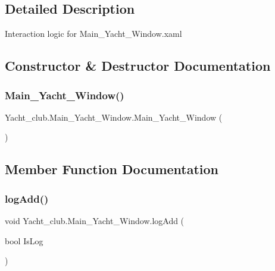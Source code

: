 \subsection{Detailed Description}
Interaction logic for Main\+\_\+\+Yacht\+\_\+\+Window.\+xaml 



\subsection{Constructor \& Destructor Documentation}
\mbox{\label{class_yacht__club_1_1_main___yacht___window_a87c4e68dfadcb4e53d85a96fd6f8d3b4}} 
\subsubsection{Main\+\_\+\+Yacht\+\_\+\+Window()}
{\footnotesize\ttfamily Yacht\+\_\+club.\+Main\+\_\+\+Yacht\+\_\+\+Window.\+Main\+\_\+\+Yacht\+\_\+\+Window (\begin{DoxyParamCaption}{ }\end{DoxyParamCaption})}



\subsection{Member Function Documentation}
\mbox{\label{class_yacht__club_1_1_main___yacht___window_a3de96dc62d46d0c97cf6c463742eeae8}} 
\subsubsection{log\+Add()}
{\footnotesize\ttfamily void Yacht\+\_\+club.\+Main\+\_\+\+Yacht\+\_\+\+Window.\+log\+Add (\begin{DoxyParamCaption}\item[{bool}]{Is\+Log }\end{DoxyParamCaption})}



